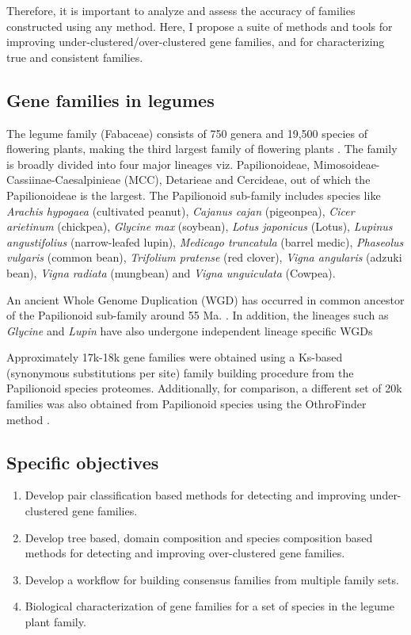 \documentclass{article}
\begin{document}
		Therefore, it is important to analyze and assess the accuracy of families constructed using any method. Here, I propose a suite of methods and tools for improving under-clustered/over-clustered gene families, and for characterizing true and consistent families.
		
		\subsection{Gene families in legumes}
		The legume family (Fabaceae) consists of 750 genera and 19,500 species of flowering plants, making the third largest family of flowering plants \citep{lewis2005legumes}. The family is broadly divided into four major lineages viz. Papilionoideae, Mimosoideae-Cassiinae-Caesalpinieae (MCC), Detarieae and Cercideae, out of which the Papilionoideae is the largest. The Papilionoid sub-family includes species like \textit{Arachis hypogaea} (cultivated peanut), \textit{Cajanus cajan} (pigeonpea), \textit{Cicer arietinum} (chickpea), \textit{Glycine max} (soybean), \textit{Lotus japonicus} (Lotus), \textit{Lupinus angustifolius} (narrow-leafed lupin), \textit{Medicago truncatula} (barrel medic), \textit{Phaseolus vulgaris} (common bean), \textit{Trifolium pratense} (red clover), \textit{Vigna angularis} (adzuki bean), \textit{Vigna radiata} (mungbean) and \textit{Vigna unguiculata} (Cowpea).
		
		An ancient Whole Genome Duplication (WGD) has occurred in common ancestor of the Papilionoid sub-family around 55 Ma. \citep{blanc2004functional,schlueter2004mining,pfeil2005placing,cannon2006legume,bertioli2009analysis,cannon2014multiple}. In addition, the  lineages such as \textit{Glycine} and \textit{Lupin} have also undergone independent lineage specific WGDs \citep{cannon2014multiple,Kroc2014} 
		
		Approximately 17k-18k gene families were obtained using a Ks-based (synonymous substitutions per site) family building procedure from the Papilionoid species proteomes. Additionally, for comparison, a different set of 20k families was also obtained from Papilionoid species using the OthroFinder method \citep{emms2015orthofinder}.
		
		\subsection{Specific objectives}
			\begin{enumerate}
				\item Develop pair classification based methods for detecting and improving under-clustered gene families.
				
				\item Develop tree based, domain composition and species composition based methods for detecting  and improving over-clustered gene families.
				
				\item Develop a workflow for building consensus families from multiple family sets.
				
				\item Biological characterization of gene families for a set of species in the legume plant family.
			\end{enumerate}
		
\end{document}
